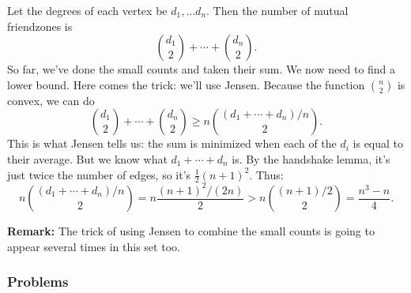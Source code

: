 \documentclass[11pt,paper=letter]{scrartcl}
\begin{document}
\begin{enumerate}
Let the degrees of each vertex be $d_1, \ldots d_n$. Then the number of mutual friendzones is \[
  \binom{d_1}{2} + \cdots + \binom{d_n}{2}.
\]
So far, we've done the small counts and taken their sum. We now need to find a lower bound. Here comes the trick: we'll use Jensen. Because the function $\binom{n}{2}$ is convex, we can do \[
  \binom{d_1}{2} + \cdots + \binom{d_n}{2} \ge n\binom{\left(d_1 + \cdots + d_n\right)/n}{2}.
\]
This is what Jensen tells us: the sum is minimized when each of the $d_i$ is equal to their average. But we know what $d_1 + \cdots + d_n$ is. By the handshake lemma, it's just twice the number of edges, so it's $\frac{1}{2}(n + 1)^2$. Thus:
\[
  n\binom{\left(d_1 + \cdots + d_n\right)/n}{2} = n\frac{(n + 1)^2/(2n)}{2} > n\binom{(n + 1)/2}{2} = \frac{n^3 - n}{4}.
\]

\textbf{Remark:} The trick of using Jensen to combine the small counts is going to appear several times in this set too. 

\end{enumerate}

\subsubsection*{Problems}
\end{document}
